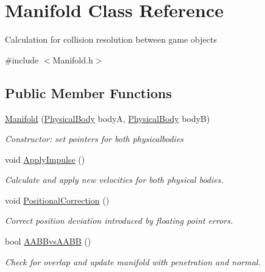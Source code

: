 \hypertarget{class_manifold}{}\section{Manifold Class Reference}
\label{class_manifold}


Calculation for collision resolution between game objects  




{\ttfamily \#include $<$Manifold.\+h$>$}

\subsection*{Public Member Functions}
\begin{DoxyCompactItemize}
\item 
\mbox{\hyperlink{class_manifold_a7a30f055ee040a7ac00284fb08b3c347}{Manifold}} (\mbox{\hyperlink{class_physical_body}{Physical\+Body}} bodyA, \mbox{\hyperlink{class_physical_body}{Physical\+Body}} bodyB)
\begin{DoxyCompactList}\small\item\em Constructor\+: set pointers for both physicalbodies \end{DoxyCompactList}\item 
void \mbox{\hyperlink{class_manifold_a27080a445e565949f9e15b8fea69f6c0}{Apply\+Impulse}} ()
\begin{DoxyCompactList}\small\item\em Calculate and apply new velocities for both physical bodies. \end{DoxyCompactList}\item 
void \mbox{\hyperlink{class_manifold_a9d3187192136eac849265f7d386f617e}{Positional\+Correction}} ()
\begin{DoxyCompactList}\small\item\em Correct position deviation introduced by floating point errors. \end{DoxyCompactList}\item 
bool \mbox{\hyperlink{class_manifold_a09f7dd163c965856905247bb15a1ee99}{A\+A\+B\+Bvs\+A\+A\+BB}} ()
\begin{DoxyCompactList}\small\item\em Check for overlap and update manifold with penetration and normal. \end{DoxyCompactList}\end{DoxyCompactItemize}
